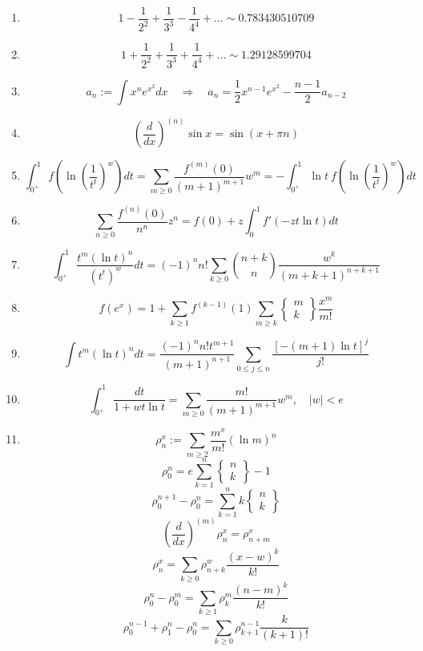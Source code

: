 \documentclass[twoside]{article}
\begin{document}
\begin{enumerate}
\item
$$ 1-\frac{1}{2^2}+\frac{1}{3^3}-\frac{1}{4^4}+\ldots \sim 0.783430510709 $$

\item
$$ 1+\frac{1}{2^2}+\frac{1}{3^3}+\frac{1}{4^4}+\ldots \sim 1.29128599704 $$

\item
$$ a_n := \int x^ne^{x^2}dx \quad\Longrightarrow\quad a_n = \frac{1}{2}x^{n-1}e^{x^2}-\frac{n-1}{2}a_{n-2} $$

\item
$$ \left(\frac{d}{dx}\right)^{(n)}\sin x = \sin(x+\pi n) $$

\item
$$ \int_{0^+}^1f(\ln\left(\frac{1}{t^t}\right)^w)dt
	= \sum_{m\ge 0}\frac{f^{(m)}(0)}{(m+1)^{m+1}}w^m
	= -\int_{0^+}^1\ln t\ f(\ln\left(\frac{1}{t^t}\right)^w)dt $$

\item
$$ \sum_{n\ge 0} \frac{f^{(n)}(0)}{n^n} z^n = f(0) + z\int_0^1f'(-zt\ln t)dt $$

\item
$$ \int_{0^+}^1\frac{t^m(\ln t)^n}{(t^t)^w}dt
	= (-1)^n n!\sum_{k\ge 0}{n+k\choose n}\frac{w^k}{(m+k+1)^{n+k+1}} $$

\item
$$ f(e^x) = 1+\sum_{k\ge 1}f^{(k-1)}(1)\sum_{m\ge k}
	\left\{\!\!\!\begin{array}{c} m \\ k\end{array}\!\!\!\right\}\frac{x^m}{m!} $$

\item
$$ \int t^m(\ln t)^ndt = \frac{(-1)^n n! t^{m+1}}{(m+1)^{n+1}}\sum_{0\le j\le n}\frac{[-(m+1)\ln t]^j}{j!} $$

\item
$$ \int_{0^+}^1\frac{dt}{1+wt\ln t} = \sum_{m\ge 0}\frac{m!}{(m+1)^{m+1}}w^m,\quad |w| < e $$

\item
$$ \rho_n^x := \sum_{m\ge 2}\frac{m^x}{m!}(\ln m)^n $$
$$ \rho_0^n = e\sum_{k=1}^n\left\{\!\!\!\begin{array}{c} n \\ k\end{array}\!\!\!\right\}-1 $$
$$ \rho_0^{n+1}-\rho_0^n = \sum_{k=1}^nk\left\{\!\!\!\begin{array}{c} n \\ k\end{array}\!\!\!\right\} $$
$$ \left(\frac{d}{dx}\right)^{(m)}\rho_n^x = \rho_{n+m}^x $$
$$ \rho_n^x = \sum_{k\ge 0}\rho_{n+k}^w\frac{(x-w)^k}{k!} $$
$$ \rho_0^n-\rho_0^m = \sum_{k\ge 1}\rho_k^m\frac{(n-m)^k}{k!} $$
$$ \rho_0^{n-1}+\rho_1^n-\rho_0^n = \sum_{k\ge 0}\rho_{k+1}^{n-1}\frac{k}{(k+1)!} $$


\end{enumerate}
\end{document}
